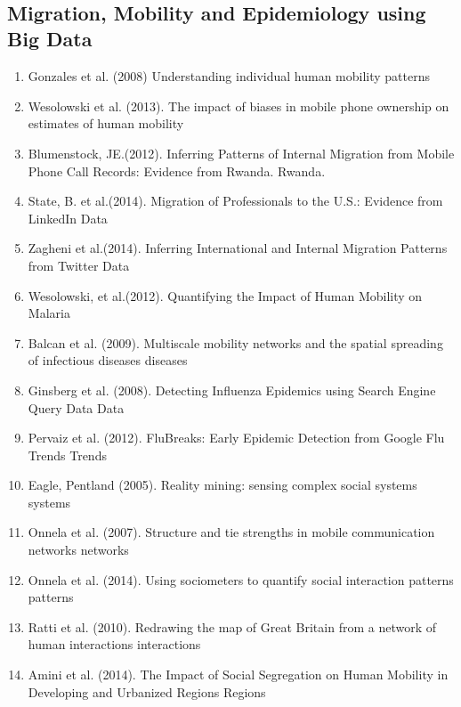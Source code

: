 \\  \subsection{Migration, Mobility and Epidemiology using Big Data}  \begin{enumerate} 
\item Gonzales et al. (2008)  Understanding individual human mobility patterns\cite{Gonz_lez_2008} 
\item Wesolowski et al. (2013).  The impact of biases in mobile phone ownership on estimates of human mobility\cite{Wesolowski_2013}  
\item  Blumenstock, JE.(2012).  Inferring Patterns of Internal Migration from Mobile Phone Call Records: Evidence from Rwanda\cite{Blumenstock_2012}. Rwanda.  
\item  State, B. et al.(2014).  Migration of Professionals to the U.S.: Evidence from LinkedIn Data \cite{State_2014}  
\item  Zagheni et al.(2014).  Inferring International and Internal Migration Patterns from Twitter Data\cite{Zagheni:2014:III:2567948.2576930}  
\item  Wesolowski, et al.(2012).  Quantifying the Impact of Human Mobility on Malaria \cite{Wesolowski_2012} 
\item Balcan et al. (2009).  Multiscale mobility networks and the spatial spreading of infectious diseases\cite{Balcan_2009} diseases  
\item Ginsberg et al. (2008).  Detecting Influenza Epidemics using Search Engine Query Data\cite{Ginsberg_2008} Data  
\item Pervaiz et al. (2012).  FluBreaks: Early Epidemic Detection from Google Flu Trends\cite{Pervaiz_2012} Trends  \item Eagle, Pentland (2005).  Reality mining: sensing complex social systems\cite{Eagle_2005} systems  
\item Onnela et al. (2007).  Structure and tie strengths in mobile communication networks\cite{Onnela_2007} networks  
\item Onnela et al. (2014).  Using sociometers to quantify social interaction patterns\cite{Onnela_2014} patterns  
\item Ratti et al. (2010).  Redrawing the map of Great Britain from a network of human interactions\cite{Ratti_2010} interactions  \item Amini et al. (2014).  The Impact of Social Segregation on Human Mobility in Developing and Urbanized Regions\cite{Amini_2014} Regions  

\end{enumerate}
